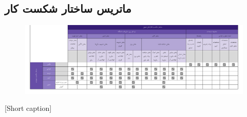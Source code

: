 \relax



\subsection{
ماتریس ساختار شکست کار 
}

\begin{center}
  \begin{figure} [h!]
    { \includegraphics[page=1, width=\textwidth]{appandecies/WBS.pdf}}
  \end{figure}
  [Short caption]{}
\end{center}
